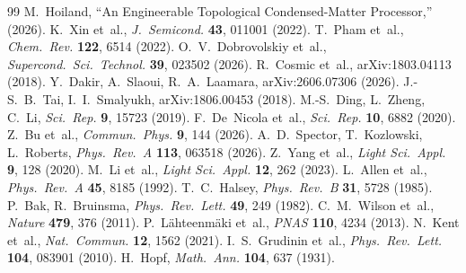 \documentclass[11pt,letterpaper]{article}
\begin{document}
\begin{thebibliography}{99}
 M.~Hoiland, ``An Engineerable Topological Condensed-Matter Processor,'' (2026).
 K.~Xin et~al., \emph{J.~Semicond.} \textbf{43}, 011001 (2022).
 T.~Pham et~al., \emph{Chem.~Rev.} \textbf{122}, 6514 (2022).
 O.~V.~Dobrovolskiy et~al., \emph{Supercond.~Sci.~Technol.} \textbf{39}, 023502 (2026).
 R.~Cosmic et~al., arXiv:1803.04113 (2018).
 Y.~Dakir, A.~Slaoui, R.~A.~Laamara, arXiv:2606.07306 (2026).
 J.-S.~B.~Tai, I.~I.~Smalyukh, arXiv:1806.00453 (2018).
 M.-S.~Ding, L.~Zheng, C.~Li, \emph{Sci.~Rep.} \textbf{9}, 15723 (2019).
 F.~De~Nicola et~al., \emph{Sci.~Rep.} \textbf{10}, 6882 (2020).
 Z.~Bu et~al., \emph{Commun.~Phys.} \textbf{9}, 144 (2026).
 A.~D.~Spector, T.~Kozlowski, L.~Roberts, \emph{Phys.~Rev.~A} \textbf{113}, 063518 (2026).
 Z.~Yang et~al., \emph{Light Sci.~Appl.} \textbf{9}, 128 (2020).
 M.~Li et~al., \emph{Light Sci.~Appl.} \textbf{12}, 262 (2023).
 L.~Allen et~al., \emph{Phys.~Rev.~A} \textbf{45}, 8185 (1992).
 T.~C.~Halsey, \emph{Phys.~Rev.~B} \textbf{31}, 5728 (1985).
 P.~Bak, R.~Bruinsma, \emph{Phys.~Rev.~Lett.} \textbf{49}, 249 (1982).
 C.~M.~Wilson et~al., \emph{Nature} \textbf{479}, 376 (2011).
 P.~L\"{a}hteenm\"{a}ki et~al., \emph{PNAS} \textbf{110}, 4234 (2013).
 N.~Kent et~al., \emph{Nat.~Commun.} \textbf{12}, 1562 (2021).
 I.~S.~Grudinin et~al., \emph{Phys.~Rev.~Lett.} \textbf{104}, 083901 (2010).
 H.~Hopf, \emph{Math.~Ann.} \textbf{104}, 637 (1931).
\end{thebibliography}
\end{document}

